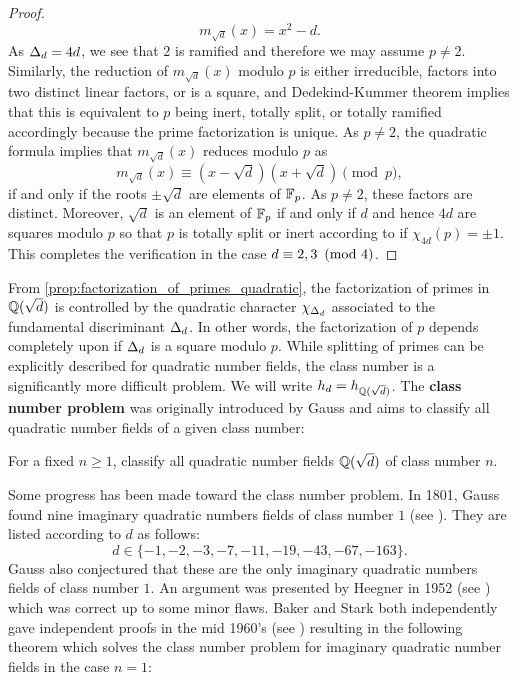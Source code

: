 \begin{proof}
      \[
        m_{\sqrt{d}}(x) = x^{2}-d.
      \]
      As $\Delta_{d} = 4d$, we see that $2$ is ramified and therefore we may assume $p \neq 2$. Similarly, the reduction of $m_{\sqrt{d}}(x)$ modulo $p$ is either irreducible, factors into two distinct linear factors, or is a square, and Dedekind-Kummer theorem implies that this is equivalent to $p$ being inert, totally split, or totally ramified accordingly because the prime factorization is unique. As $p \neq 2$, the quadratic formula implies that $m_{\sqrt{d}}(x)$ reduces modulo $p$ as
      \[
        m_{\sqrt{d}}(x) \equiv (x-\sqrt{d})(x+\sqrt{d}) \pmod{p},
      \]
      if and only if the roots $\pm\sqrt{d}$ are elements of $\mathbb{F}_{p}$. As $p \neq 2$, these factors are distinct. Moreover, $\sqrt{d}$ is an element of $\mathbb{F}_{p}$ if and only if $d$ and hence $4d$ are squares modulo $p$ so that $p$ is totally split or inert according to if $\chi_{4d}(p) = \pm1$. This completes the verification in the case $d \equiv 2,3 \ \left(\text{mod }4\right)$.
    \end{proof}

    From \cref{prop:factorization_of_primes_quadratic}, the factorization of primes in $\mathbb{Q}(\sqrt{d})$ is controlled by the quadratic character $\chi_{\Delta_{d}}$ associated to the fundamental discriminant $\Delta_{d}$. In other words, the factorization of $p$ depends completely upon if $\Delta_{d}$ is a square modulo $p$. While splitting of primes can be explicitly described for quadratic number fields, the class number is a significantly more difficult problem. We will write $h_{d} = h_{\mathbb{Q}(\sqrt{d})}$. The \textbf{class number problem} was originally introduced by Gauss and aims to classify all quadratic number fields of a given class number:

    \begin{problem*}
      For a fixed $n \ge 1$, classify all quadratic number fields $\mathbb{Q}(\sqrt{d})$ of class number $n$.
    \end{problem*}

    Some progress has been made toward the class number problem. In 1801, Gauss found nine imaginary quadratic numbers fields of class number $1$ (see \cite{gauss1801disquisitiones}). They are listed according to $d$ as follows:
    \[
      d  \in \{-1,-2,-3,-7,-11,-19,-43,-67,-163\}.
    \]
    Gauss also conjectured that these are the only imaginary quadratic numbers fields of class number $1$. An argument was presented by Heegner in 1952 (see \cite{heegner1952diophantische}) which was correct up to some minor flaws. Baker and Stark both independently gave independent proofs in the mid 1960's (see \cite{baker1967linear,stark1967complete}) resulting in the following theorem which solves the class number problem for imaginary quadratic number fields in the case $n = 1$:

